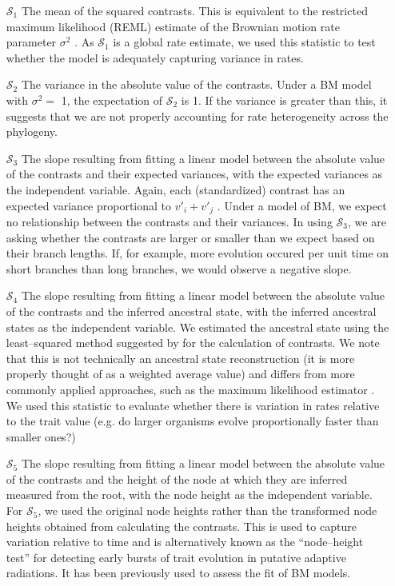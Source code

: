 \documentclass[a4paper,12pt]{article}
\begin{document}
\begin{enumerate}
\item[$\mathcal{S}_1$] The mean of the squared contrasts. This is equivalent to the restricted maximum likelihood (REML) estimate of the Brownian motion rate parameter $\sigma^2$ \citep{Garland1992, Rohlf2001}. As $\mathcal{S}_1$ is a global rate estimate, we used this statistic to test whether the model is adequately capturing variance in rates.

\item[$\mathcal{S}_2$] The variance in the absolute value of the contrasts. Under a BM model with $\sigma^2 =$ 1, the expectation of $\mathcal{S}_2$ is 1. If the variance is greater than this, it suggests that we are not properly accounting for rate heterogeneity across the phylogeny.

\item[$\mathcal{S}_3$] The slope resulting from fitting a linear model between the absolute value of the contrasts and their expected variances, with the expected variances as the independent variable. Again, each (standardized) contrast has an expected variance proportional to $v\prime_i + v\prime_j$  \citep{Felsenstein1985}. Under a model of BM, we expect no relationship between the contrasts and their variances. In using $\mathcal{S}_3$, we are asking whether the contrasts are larger or smaller than we expect based on their branch lengths. If, for example, more evolution occured per unit time on short branches than long branches, we would observe a negative slope.

\item[$\mathcal{S}_4$] The slope resulting from fitting a linear model between the absolute value of the contrasts and the inferred ancestral state, with the inferred ancestral states as the independent variable. We estimated the ancestral state using the least--squared method suggested by \citep{Felsenstein1985} for the calculation of contrasts. We note that this is not technically an ancestral state reconstruction (it is more properly thought of as a weighted average value) and differs from more commonly applied approaches, such as the  maximum likelihood estimator \citep{Schluter1997}. We used this statistic to evaluate whether there is variation in rates relative to the trait value (e.g. do larger organisms evolve proportionally faster than smaller ones?)

\item[$\mathcal{S}_5$] The slope resulting from fitting a linear model between the absolute value of the contrasts and the height of the node at which they are inferred measured from the root, with the node height as the independent variable. For $\mathcal{S}_5$, we used the original node heights rather than the transformed node heights obtained from calculating the contrasts. This is used to capture variation relative to time and is alternatively known as the ``node--height test'' \citep{FreckletonHarvey2006} for detecting early bursts of trait evolution in putative adaptive radiations. It has been  previously used to assess the fit of BM models.


\end{enumerate}
\end{document}
